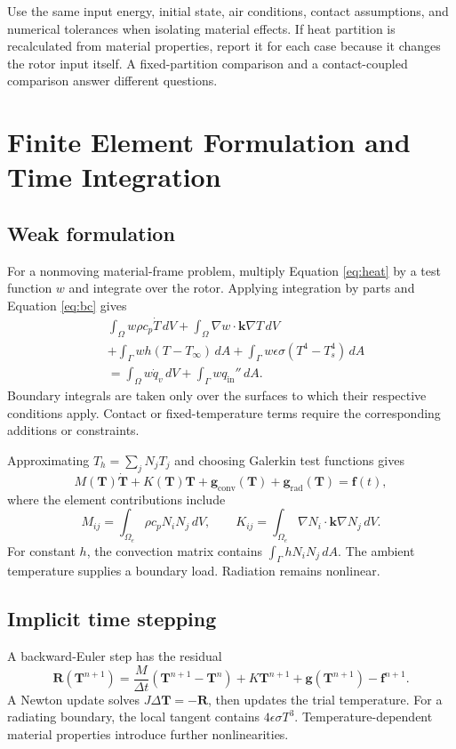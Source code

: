 \documentclass[11pt,a4paper]{article}
\newcommand{\sectionpage}[1]{\clearpage\section{#1}}
\begin{document}
Use the same input energy, initial state, air conditions, contact assumptions, and numerical tolerances when isolating material effects. If heat partition is recalculated from material properties, report it for each case because it changes the rotor input itself. A fixed-partition comparison and a contact-coupled comparison answer different questions.

\sectionpage{Finite Element Formulation and Time Integration}
\subsection{Weak formulation}
For a nonmoving material-frame problem, multiply Equation \eqref{eq:heat} by a test function $w$ and integrate over the rotor. Applying integration by parts and Equation \eqref{eq:bc} gives
\begin{align}
&\int_\Omega w\rho c_p\dot T\,dV
+\int_\Omega\nabla w\cdot\mathbf k\nabla T\,dV\nonumber\\
&+\int_{\Gamma}wh(T-T_\infty)\,dA
+\int_{\Gamma}w\epsilon\sigma(T^4-T_s^4)\,dA\nonumber\\
&=\int_\Omega w\dot q_v\,dV+\int_{\Gamma}wq_{\mathrm{in}}''\,dA.
\end{align}
Boundary integrals are taken only over the surfaces to which their respective conditions apply. Contact or fixed-temperature terms require the corresponding additions or constraints.

Approximating $T_h=\sum_jN_jT_j$ and choosing Galerkin test functions gives
\begin{equation}
M(\mathbf T)\dot{\mathbf T}+K(\mathbf T)\mathbf T+
\mathbf g_{\mathrm{conv}}(\mathbf T)+\mathbf g_{\mathrm{rad}}(\mathbf T)=\mathbf f(t),
\end{equation}
where the element contributions include
\begin{equation}
M_{ij}=\int_{\Omega_e}\rho c_pN_iN_j\,dV,\qquad
K_{ij}=\int_{\Omega_e}\nabla N_i\cdot\mathbf k\nabla N_j\,dV.
\end{equation}
For constant $h$, the convection matrix contains $\int_\Gamma hN_iN_j\,dA$. The ambient temperature supplies a boundary load. Radiation remains nonlinear.

\subsection{Implicit time stepping}
A backward-Euler step has the residual
\begin{equation}
\mathbf R(\mathbf T^{n+1})=
\frac{M}{\Delta t}(\mathbf T^{n+1}-\mathbf T^n)
+K\mathbf T^{n+1}+\mathbf g(\mathbf T^{n+1})-\mathbf f^{n+1}.
\end{equation}
A Newton update solves $J\Delta\mathbf T=-\mathbf R$, then updates the trial temperature. For a radiating boundary, the local tangent contains $4\epsilon\sigma T^3$. Temperature-dependent material properties introduce further nonlinearities.
\end{document}
